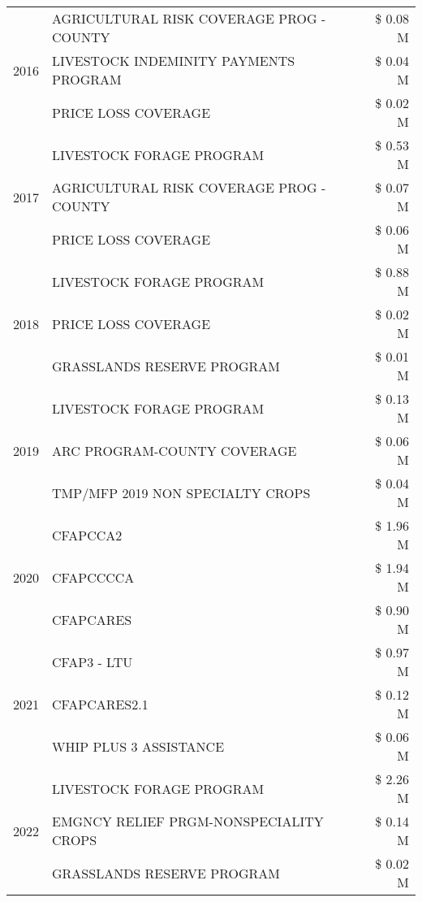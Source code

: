 \begin{tabular}{llr}
\cline{1-3}
\multirow[t]{3}{*}{2016} & AGRICULTURAL RISK COVERAGE PROG - COUNTY & \$ 0.08 M \\
 & LIVESTOCK INDEMINITY PAYMENTS PROGRAM & \$ 0.04 M \\
 & PRICE LOSS COVERAGE & \$ 0.02 M \\
\cline{1-3}
\multirow[t]{3}{*}{2017} & LIVESTOCK FORAGE PROGRAM & \$ 0.53 M \\
 & AGRICULTURAL RISK COVERAGE PROG - COUNTY & \$ 0.07 M \\
 & PRICE LOSS COVERAGE & \$ 0.06 M \\
\cline{1-3}
\multirow[t]{3}{*}{2018} & LIVESTOCK FORAGE PROGRAM & \$ 0.88 M \\
 & PRICE LOSS COVERAGE & \$ 0.02 M \\
 & GRASSLANDS RESERVE PROGRAM & \$ 0.01 M \\
\cline{1-3}
\multirow[t]{3}{*}{2019} & LIVESTOCK FORAGE PROGRAM & \$ 0.13 M \\
 & ARC PROGRAM-COUNTY COVERAGE & \$ 0.06 M \\
 & TMP/MFP 2019 NON SPECIALTY CROPS & \$ 0.04 M \\
\cline{1-3}
\multirow[t]{3}{*}{2020} & CFAPCCA2 & \$ 1.96 M \\
 & CFAPCCCCA & \$ 1.94 M \\
 & CFAPCARES & \$ 0.90 M \\
\cline{1-3}
\multirow[t]{3}{*}{2021} & CFAP3 - LTU & \$ 0.97 M \\
 & CFAPCARES2.1 & \$ 0.12 M \\
 & WHIP PLUS 3 ASSISTANCE & \$ 0.06 M \\
\cline{1-3}
\multirow[t]{3}{*}{2022} & LIVESTOCK FORAGE PROGRAM & \$ 2.26 M \\
 & EMGNCY RELIEF PRGM-NONSPECIALITY CROPS & \$ 0.14 M \\
 & GRASSLANDS RESERVE PROGRAM & \$ 0.02 M \\
\cline{1-3}
\bottomrule
\end{tabular}
